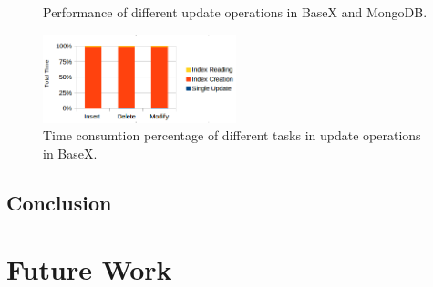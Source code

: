 \documentclass[a4paper,12pt]{article}
\begin{document}
\begin{figure}
\centering
{}
\centering
{}
\caption{Performance of different update operations in BaseX and MongoDB.}
\label{figBXvsMongoUpdate}
\end{figure}


\begin{figure}
\centering
\includegraphics[width=0.5\textwidth]{BXUpdate.png}
\caption{Time consumtion percentage of different tasks in update operations in BaseX.}
\label{figBXUpdate}
\end{figure}

\newpage
\subsection{Conclusion}


\newpage
\section{Future Work}
\label{s.future}
\newpage


\end{document}
